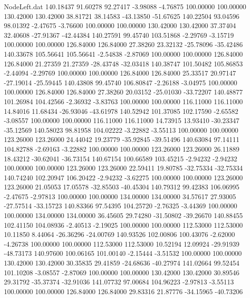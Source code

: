 \begin{filecontents}{NodeLeft.dat}
 140.18437   91.60278   92.27417    -3.98088   -4.76875  100.00000  100.00000  130.42000  130.42000   38.81721   38.14583  -43.13850  -51.67625
 140.22504   93.04596   98.01392    -2.47675   -3.76600  100.00000  100.00000  130.42000  130.42000   37.37404   32.40608  -27.91367  -42.44384
 140.27591   99.45740  103.51868    -2.29769   -3.15719  100.00000  100.00000  126.84000  126.84000   27.38260   23.32132  -25.78096  -35.42486
 140.33678  105.56641  105.56641    -2.54838   -2.87069  100.00000  100.00000  126.84000  126.84000   21.27359   21.27359  -28.43748  -32.03418
 140.38747  101.50482  105.86853    -2.44094   -2.29769  100.00000  100.00000  126.84000  126.84000   25.33517   20.97147  -27.19014  -25.59445
 140.43808   99.45740  106.80847    -2.26188   -3.04975  100.00000  100.00000  126.84000  126.84000   27.38260   20.03152  -25.01030  -33.72207
 140.48877  101.26984  104.42566    -2.36932   -3.83763  100.00000  100.00000  116.11000  116.11000   14.84016   11.68434  -26.93046  -43.61978
 140.52942  101.37085  102.17590    -2.65582   -3.08557  100.00000  100.00000  116.11000  116.11000   14.73915   13.93410  -30.23347  -35.12569
 140.58023   98.81958  104.02222    -3.22882   -3.55113  100.00000  100.00000  123.26000  123.26000   24.44042   19.23779  -35.92845  -39.51496
 140.63084   97.14111  104.82788    -2.69163   -3.22882  100.00000  100.00000  123.26000  123.26000   26.11889   18.43212  -30.62041  -36.73154
 140.67154  100.66589  103.45215    -2.94232   -2.94232  100.00000  100.00000  123.26000  123.26000   22.59411   19.80785  -32.75334  -32.75334
 140.74240  102.20947  106.20422    -2.94232   -3.62275  100.00000  100.00000  123.26000  123.26000   21.05053   17.05578  -32.85503  -40.45304
 140.79312   99.42383  106.06995    -2.47675   -2.97813  100.00000  100.00000  134.00000  134.00000   34.57617   27.93005  -27.57514  -33.15723
 140.83366   97.54395  104.25720    -2.76325   -3.44369  100.00000  100.00000  134.00000  134.00000   36.45605   29.74280  -31.50802  -39.26670
 140.88455  102.41150  104.08936    -2.40513   -2.19025  100.00000  100.00000  112.53000  112.53000   10.11850    8.44064  -26.36296  -24.00769
 140.93526  102.00806  100.43076    -2.62000   -4.26738  100.00000  100.00000  112.53000  112.53000   10.52194   12.09924  -29.91939  -48.73173
 140.97600  100.06165  101.00140    -2.15444   -3.51532  100.00000  100.00000  130.42000  130.42000   30.35835   29.41859  -24.68636  -40.27974
 141.02664   99.52454  101.10208    -3.08557   -2.87069  100.00000  100.00000  130.42000  130.42000   30.89546   29.31792  -35.37374  -32.91036
 141.07732   97.00684  104.96223    -2.97813   -3.55113  100.00000  100.00000  126.84000  126.84000   29.83316   21.87776  -34.15965  -40.73206

\end{filecontents}
